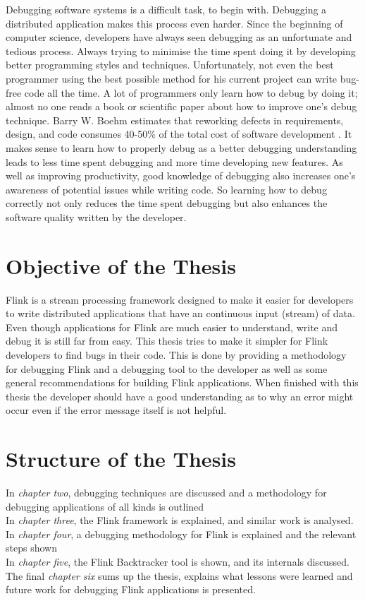 Debugging software systems is a difficult task, to begin with. Debugging a distributed application makes this process even harder. Since the beginning of computer science, developers have always seen debugging as an unfortunate and tedious process. Always trying to minimise the time spent doing it by developing better programming styles and techniques. Unfortunately, not even the best programmer using the best possible method for his current project can write bug-free code all the time. A lot of programmers only learn how to debug by doing it; almost no one reads a book or scientific paper about how to improve one's debug technique. Barry W. Boehm estimates that reworking defects in requirements, design, and code consumes 40-50\% of the total cost of software development \cite{1663694}. It makes sense to learn how to properly debug as a better debugging understanding leads to less time spent debugging and more time developing new features. As well as improving productivity, good knowledge of debugging also increases one's awareness of potential issues while writing code. So learning how to debug correctly not only reduces the time spent debugging but also enhances the software quality written by the developer.

\section{Objective of the Thesis}
Flink is a stream processing framework designed to make it easier for developers to write distributed applications that have an continuous input (stream) of data. Even though applications for Flink are much easier to understand, write and debug it is still far from easy. This thesis tries to make it simpler for Flink developers to find bugs in their code. This is done by providing a methodology for debugging Flink and a debugging tool to the developer as well as some general recommendations for building Flink applications. When finished with this thesis the developer should have a good understanding as to why an error might occur even if the error message itself is not helpful.

\pagebreak

\section{Structure of the Thesis}
In \emph{chapter two}, debugging techniques are discussed and a methodology for debugging applications of all kinds is outlined\\
In \emph{chapter three}, the Flink framework is explained, and similar work is analysed.\\
In \emph{chapter four}, a debugging methodology for Flink is explained and the relevant steps shown\\
In \emph{chapter five}, the Flink Backtracker tool is shown, and its internals discussed.\\
The final \emph{chapter six} sums up the thesis, explains what lessons were learned and future work for debugging Flink applications is presented.
